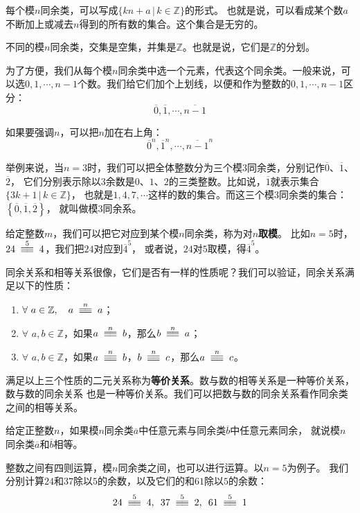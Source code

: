\documentclass[12pt,UTF8]{ctexbook}
\begin{document}
每个模$n$同余类，可以写成$\{kn + a \, | \, k\in\mathbb{Z} \}$的形式。
也就是说，可以看成某个数$a$不断加上或减去$n$得到的所有数的集合。这个集合是无穷的。

不同的模$n$同余类，交集是空集，并集是$\mathbb{Z}$。也就是说，它们是$\mathbb{Z}$的分划。

为了方便，我们从每个模$n$同余类中选一个元素，代表这个同余类。一般来说，可以选$0,1,\cdots,n-1$个数。我们给它们加个上划线，以便和作为整数的$0,1,\cdots,n-1$区分：
$$\overline{0},\overline{1},\cdots,\overline{n-1}$$

如果要强调$n$，可以把$n$加在右上角：
$$\overline{0}^n,\overline{1}^n,\cdots,\overline{n-1}^n$$

举例来说，当$n=3$时，我们可以把全体整数分为三个模$3$同余类，分别记作$\overline{0}$、$\overline{1}$、$\overline{2}$，
它们分别表示除以$3$余数是$0$、$1$、$2$的三类整数。比如说，$\overline{1}$就表示集合$\{3k + 1 \, | \, k\in\mathbb{Z} \}$，
也就是$1, 4, 7,\cdots$这样的数的集合。而这三个模$3$同余类的集合：$\left\{\overline{0},\overline{1},\overline{2}\right\}$，
就叫做模$3$同余系。

给定整数$m$，我们可以把它对应到某个模$n$同余类，称为对$n$\textbf{取模}。
比如$n=5$时，$24 \tong{5} 4$，我们把$24$对应到$\overline{4}^5$，
或者说，$24$对$5$取模，得$\overline{4}^5$。

同余关系和相等关系很像，它们是否有一样的性质呢？我们可以验证，同余关系满足以下的性质：
\begin{enumerate}
    \item $\forall \,\, a\in \mathbb{Z}, \quad a \tong{n} a$；
    \item $\forall \,\, a, b \in \mathbb{Z}$，如果$a \tong{n} b$，那么$b \tong{n} a$；
    \item $\forall \,\, a, b \in \mathbb{Z}$，如果$a \tong{n} b$，$b \tong{n} c$，那么$a \tong{n} c$。
\end{enumerate}

满足以上三个性质的二元关系称为\textbf{等价关系}。数与数的相等关系是一种等价关系，数与数的同余关系
也是一种等价关系。我们可以把数与数的同余关系看作同余类之间的相等关系。

\begin{df}
    给定正整数$n$，如果模$n$同余类$\overline{a}$中任意元素与同余类$\overline{b}$中任意元素同余，
    就说模$n$同余类$\overline{a}$和$\overline{b}$相等。
\end{df}

整数之间有四则运算，模$n$同余类之间，也可以进行运算。以$n=5$为例子。
我们分别计算$24$和$37$除以$5$的余数，以及它们的和$61$除以$5$的余数：
$$ 24 \tong{5} 4, \,\,\, 37 \tong{5} 2 , \,\,\, 61 \tong{5} 1$$
\end{document}

